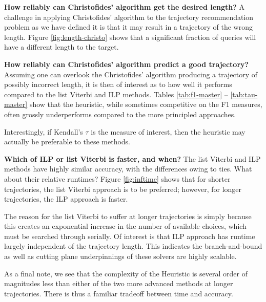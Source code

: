 \textbf{How reliably can Christofides' algorithm get the desired length?}
A challenge in applying Christofides' algorithm to the trajectory recommendation problem as we have defined it
is that it may result in a trajectory of the wrong length.
Figure \ref{fig:length-christo} shows that a significant fraction of queries will have a different length to the target.

\textbf{How reliably can Christofides' algorithm predict a good trajectory?}
Assuming one can overlook the Christofides' algorithm producing a trajectory of possibly incorrect length,
it is then of interest as to how well it performs compared to the list Viterbi and ILP methods.
Tables \ref{tab:f1-master} -- \ref{tab:tau-master} show that the heuristic, while sometimes competitive on the F1 measures, often
grossly underperforms compared to the more principled approaches.

Interestingly, if Kendall's $\tau$ is the measure of interest, then the heuristic may actually be preferable to these methods.

\textbf{Which of ILP or list Viterbi is faster, and when?}
The list Viterbi and ILP methods have highly similar accuracy, with the differences owing to ties.
What about their relative runtimes?
Figure \ref{fig:inftime} shows that for shorter trajectories, the list Viterbi approach is to be preferred;
however, for longer trajectories, the ILP approach is faster.

The reason for the list Viterbi to suffer at longer trajectories is simply because this creates an exponential increase in the number of available choices, which must be searched through serially.
Of interest is that ILP approach has runtime largely independent of the trajectory length.
This indicates the branch-and-bound as well as cutting plane underpinnings of these solvers are highly scalable.

As a final note, we see that the complexity of the Heuristic is several order of magnitudes less than either of the two more advanced methods at longer trajectories.
There is thus a familiar tradeoff between time and accuracy.



